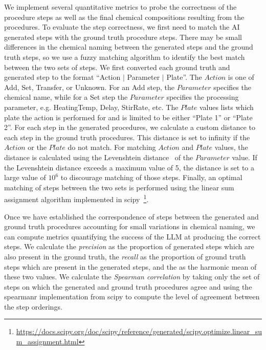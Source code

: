 \documentclass[sn-nature, twocolumn]{sn-jnl}%
\theoremstyle{thmstyleone}%
\theoremstyle{thmstyletwo}%
\theoremstyle{thmstylethree}%
\begin{document}
We implement several quantitative metrics to probe the correctness of the procedure steps as well as the final chemical compositions resulting from the procedures. To evaluate the step correctness, we first need to match the AI generated steps with the ground truth procedure steps. There may be small differences in the chemical naming between the generated steps and the ground truth steps, so we use a fuzzy matching algorithm to identify the best match between the two sets of steps. We first converted each ground truth and generated step to the format ``Action $|$ Parameter $|$ Plate''. The $Action$ is one of Add, Set, Transfer, or Unknown. For an Add step, the $Parameter$ specifies the chemical name, while for a Set step the $Parameter$ specifies the processing parameter, e.g. HeatingTemp, Delay, StirRate, etc. The $Plate$ values lists which plate the action is performed for and is limited to be either ``Plate 1'' or ``Plate 2''. For each step in the generated procedures, we calculate a custom distance to each step in the ground truth procedures. This distance is set to infinity if the $Action$ or the $Plate$ do not match. For matching $Action$ and $Plate$ values, the distance is calculated using the Levenshtein distance~\cite{1966Levenshtein} of the $Parameter$ value. If the Levenshtein distance exceeds a maximum value of 5, the distance is set to a large value of $10^6$ to discourage matching of those steps. Finally, an optimal matching of steps between the two sets is performed using the linear sum assignment algorithm implemented in scipy~\footnote{\url{https://docs.scipy.org/doc/scipy/reference/generated/scipy.optimize.linear_sum_assignment.html}}. 

Once we have established the correspondence of steps between the generated and ground truth procedures accounting for small variations in chemical naming, we can compute metrics quantifying the success of the LLM at producing the correct steps. We calculate the \textit{precision} as the proportion of generated steps which are also present in the ground truth, the \textit{recall} as the proportion of ground truth steps which are present in the generated steps, and the  as the harmonic mean of these two values. We calculate the \textit{Spearman correlation} by taking only the set of steps on which the generated and ground truth procedures agree and using the spearmanr implementation from scipy to compute the level of agreement between the step orderings.
\end{document}
